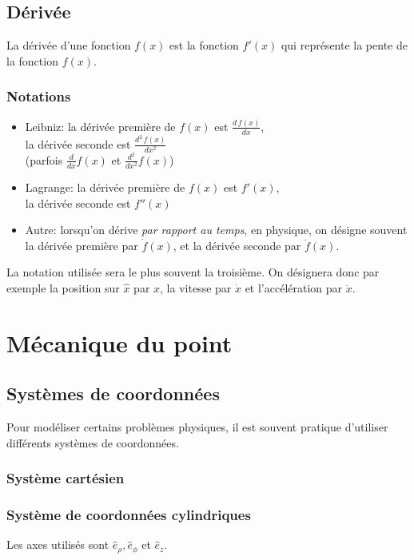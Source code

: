 \documentclass{article}
\numberwithin{equation}{section}
\begin{document}
\subsection{Dérivée}
La dérivée d'une fonction \(f(x)\) est la fonction \(f'(x)\) qui représente la pente de la fonction \(f(x)\).
\subsubsection{Notations}
\begin{itemize}
	\item Leibniz: la dérivée première de \(f(x)\) est \(\frac{d\,f(x)}{dx}\), \\
		la dérivée seconde est \(\frac{d^2\,f(x)}{dx^2}\) \\
		(parfois \(\frac{d}{dx}f(x)\) et \(\frac{d^2}{dx^2}f(x)\))
	\item Lagrange: la dérivée première de \(f(x)\) est \(f'(x)\), \\
		la dérivée seconde est \(f''(x)\)
	\item Autre: lorsqu'on dérive \emph{par rapport au temps}, en physique, on désigne souvent la dérivée première par \(\dot f(x)\), et la dérivée seconde par \(\ddot f(x)\).
\end{itemize}

La notation utilisée sera le plus souvent la troisième. On désignera donc par exemple la position sur \(\hat x\) par \(x\), la vitesse par \(\dot x\) et l'accélération par \(\ddot x\).

\section{Mécanique du point}

\subsection{Systèmes de coordonnées}
Pour modéliser certains problèmes physiques, il est souvent pratique d'utiliser différents systèmes de coordonnées.

\subsubsection{Système cartésien}

\subsubsection{Système de coordonnées cylindriques}
Les axes utilisés sont \(\hat e_\rho, \hat e_\phi\) et \(\hat e_z\). \\
\end{document}
